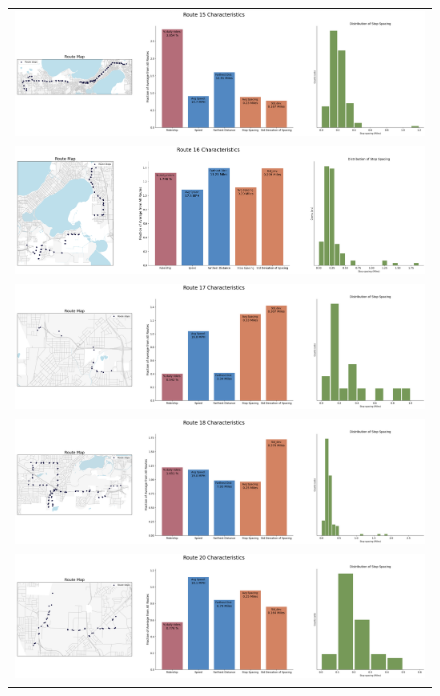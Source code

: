 \documentclass[letter]{article}
\begin{document}
\begin{figure}
\begin{center}
\begin{tabular}{ c }


  \includegraphics[width=150mm]{Route_15.png}  \\
  \includegraphics[width=150mm]{Route_16.png} \\
  \includegraphics[width=150mm]{Route_17.png}  \\
  \includegraphics[width=150mm]{Route_18.png}  \\
  \includegraphics[width=150mm]{Route_20.png}  \\
  
  \end{tabular}
\end{center}
\end{figure}
\end{document}
